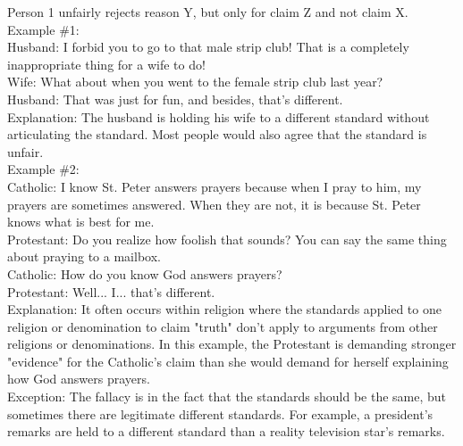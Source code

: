 \documentclass[a4paper,12pt,single,pdftex]{scrartcl}
\begin{document}
    
      Person 1 unfairly rejects reason Y, but only for claim Z and not claim X.
    \\

    
      Example \#1:
    \\

    
      Husband: I forbid you to go to that male strip club! That is a completely inappropriate thing for a wife to do!
    \\

    
      Wife: What about when you went to the female strip club last year?
    \\

    
      Husband: That was just for fun, and besides, that's different.
    \\

    
      Explanation: The husband is holding his wife to a different standard without articulating the standard. Most people would also agree that the standard is unfair.
    \\

    
      Example \#2:
    \\

    
      Catholic: I know St. Peter answers prayers because when I pray to him, my prayers are sometimes answered. When they are not, it is because St. Peter knows what is best for me.
    \\

    
      Protestant: Do you realize how foolish that sounds? You can say the same thing about praying to a mailbox.
    \\

    
      Catholic: How do you know God answers prayers?
    \\

    
      Protestant: Well... I... that's different.
    \\

    
      Explanation: It often occurs within religion where the standards applied to one religion or denomination to claim "truth" don't apply to arguments from other religions or denominations. In this example, the Protestant is demanding stronger "evidence" for the Catholic's claim than she would demand for herself explaining how God answers prayers.
    \\

    
      Exception: The fallacy is in the fact that the standards should  be the same, but sometimes there are legitimate different standards. For example, a president's remarks are held to a different standard than a reality television star’s remarks.
    \\
\end{document}
